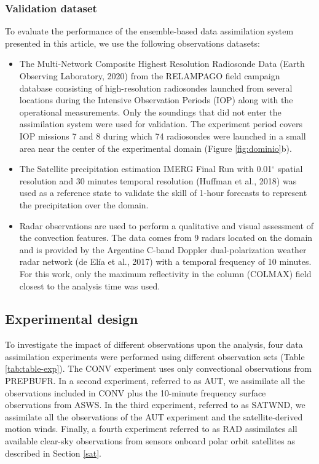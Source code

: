 \documentclass[final,5p,times,twocolumn,authoryear]{elsarticle} %
\begin{document}
\hypertarget{validation-dataset}{%
\subsubsection{Validation dataset}\label{validation-dataset}}

To evaluate the performance of the ensemble-based data assimilation system presented in this article, we use the following observations datasets:

\begin{itemize}
\item
  The Multi-Network Composite Highest Resolution Radiosonde Data (Earth Observing Laboratory, 2020) from the RELAMPAGO field campaign database consisting of high-resolution radiosondes launched from several locations during the Intensive Observation Periods (IOP) along with the operational measurements. Only the soundings that did not enter the assimilation system were used for validation. The experiment period covers IOP missions 7 and 8 during which 74 radiosondes were launched in a small area near the center of the experimental domain (Figure \ref{fig:dominio}b).
\item
  The Satellite precipitation estimation IMERG Final Run with 0.01\(^{\circ}\) spatial resolution and 30 minutes temporal resolution (Huffman et al., 2018) was used as a reference state to validate the skill of 1-hour forecasts to represent the precipitation over the domain.
\item
  Radar observations are used to perform a qualitative and visual assessment of the convection features. The data comes from 9 radars located on the domain and is provided by the Argentine C-band Doppler dual-polarization weather radar network (de Elía et al., 2017) with a temporal frequency of 10 minutes. For this work, only the maximum reflectivity in the column (COLMAX) field closest to the analysis time was used.
\end{itemize}

\hypertarget{exp}{%
\subsection{Experimental design}\label{exp}}

To investigate the impact of different observations upon the analysis, four data assimilation experiments were performed using different observation sets (Table \ref{tab:table-exp}). The CONV experiment uses only convectional observations from PREPBUFR. In a second experiment, referred to as AUT, we assimilate all the observations included in CONV plus the 10-minute frequency surface observations from ASWS. In the third experiment, referred to as SATWND, we assimilate all the observations of the AUT experiment and the satellite-derived motion winds. Finally, a fourth experiment referred to as RAD assimilates all available clear-sky observations from sensors onboard polar orbit satellites as described in Section \ref{sat}.
\end{document}
